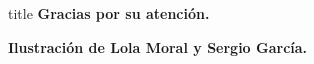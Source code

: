 	\begin{frame}
		\vspace{0.50\paperheight}
		\begin{titleBox}					
			\begin{beamercolorbox}[sep=2pt,center]{title}	
				\textbf{Gracias por su atención.}\par
			\end{beamercolorbox}
		\end{titleBox}
		\begin{flushright}
			\fontsize{8}{8}\selectfont
			\textbf{Ilustración de Lola Moral y Sergio García.}
		\end{flushright}
	\end{frame}
	